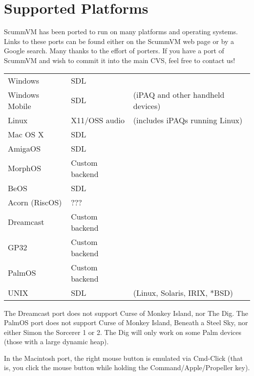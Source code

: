 

\section{Supported Platforms}
ScummVM has been ported to run on many platforms and operating systems.
Links to these ports can be found either on the ScummVM web page or by a
Google search. Many thanks to the effort of porters. If you have a port of
ScummVM and wish to commit it into the main CVS, feel free to contact us!

\begin{tabular}{lll}
Windows         & SDL\\
Windows Mobile  & SDL           &(iPAQ and other handheld devices)\\
Linux           & X11/OSS audio &(includes iPAQs running Linux)\\
Mac OS X        & SDL\\
AmigaOS         & SDL\\
MorphOS         & Custom backend\\
BeOS            & SDL\\
Acorn (RiscOS)  & ???\\
Dreamcast       & Custom backend \\
GP32            & Custom backend\\
PalmOS          & Custom backend\\
UNIX            & SDL    &(Linux, Solaris, IRIX, *BSD)\\
\end{tabular}

The Dreamcast port does not support Curse of Monkey Island, nor The Dig.
The PalmOS port does not support Curse of Monkey Island, Beneath a Steel
Sky, nor either Simon the Sorcerer 1 or 2. The Dig will only work on some
Palm devices (those with a large dynamic heap).

In the Macintosh port, the right mouse button is emulated via Cmd-Click (that
is, you click the mouse button while holding the Command/Apple/Propeller key).
